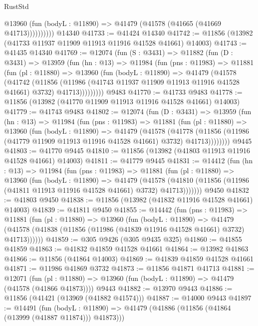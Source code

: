 \begin{lexlean}{RustStd}
\begin{coremodule}
              @13960 (fun (bodyL : @11890) => @41479 (@41578 (@41665 (@41669 @41713))))))))))
    @14340
@41733 := @41424 @14340
@41742 := @11856 (@13982 (@41733 @11937 @11909 @11913 @11916 @41528 @41661) @14003)
@41743 := @41435 @14340
@41769 := @12074
    (fun (S : @3431) =>
    @11882
      (fun (D : @3431) =>
      @13959
        (fun (hn : @13) =>
        @11984
          (fun (pns : @11983) =>
          @11881
            (fun (pl : @11880) =>
            @13960
              (fun (bodyL : @11890) =>
              @41479
                (@41578
                  (@41742
                    (@11856
                      (@11986 (@41743 @11937 @11909 @11913 @11916 @41528 @41661) @3732)
                      @41713)))))))))
    @9483
@41770 := @41733 @9483
@41778 := @11856 (@13982 (@41770 @11909 @11913 @11916 @41528 @41661) @14003)
@41779 := @41743 @9483
@41802 := @12074
    (fun (D : @3431) =>
    @13959
      (fun (hn : @13) =>
      @11984
        (fun (pns : @11983) =>
        @11881
          (fun (pl : @11880) =>
          @13960
            (fun (bodyL : @11890) =>
            @41479
              (@41578
                (@41778
                  (@11856 (@11986 (@41779 @11909 @11913 @11916 @41528 @41661) @3732) @41713))))))))
    @9445
@41803 := @41770 @9445
@41810 := @11856 (@13982 (@41803 @11913 @11916 @41528 @41661) @14003)
@41811 := @41779 @9445
@41831 := @14412
    (fun (hn : @13) =>
    @11984
      (fun (pns : @11983) =>
      @11881
        (fun (pl : @11880) =>
        @13960
          (fun (bodyL : @11890) =>
          @41479
            (@41578
              (@41810 (@11856 (@11986 (@41811 @11913 @11916 @41528 @41661) @3732) @41713)))))))
    @9450
@41832 := @41803 @9450
@41838 := @11856 (@13982 (@41832 @11916 @41528 @41661) @14003)
@41839 := @41811 @9450
@41855 := @14442
    (fun (pns : @11983) =>
    @11881
      (fun (pl : @11880) =>
      @13960
        (fun (bodyL : @11890) =>
        @41479 (@41578 (@41838 (@11856 (@11986 (@41839 @11916 @41528 @41661) @3732) @41713))))))
@41859 := @305 @9426 (@305 @9435 @325)
@41860 := @41855 @41859
@41863 := @41832 @41859 @41528 @41661
@41864 := @13982 @41863
@41866 := @11856 (@41864 @14003)
@41869 := @41839 @41859 @41528 @41661
@41871 := @11986 @41869 @3732
@41873 := @11856 @41871 @41713
@41881 := @12071
    (fun (pl : @11880) => @13960 (fun (bodyL : @11890) => @41479 (@41578 (@41866 @41873))))
    @9443
@41882 := @13970 @9443
@41886 := @11856 (@41421 (@13969 (@41882 @41574)))
@41887 := @14000 @9443
@41897 := @14491
    (fun (bodyL : @11890) => @41479 (@41886 (@11856 (@41864 (@13999 (@41887 @11874))) @41873)))

\end{coremodule}
\end{lexlean}
